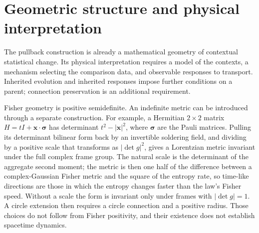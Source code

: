 \section{Geometric structure and physical interpretation}

The pullback construction is already a mathematical geometry of contextual statistical change. Its physical interpretation requires a model of the contexts, a mechanism selecting the comparison data, and observable responses to transport. Inherited evolution and inherited responses impose further conditions on a parent; connection preservation is an additional requirement.

Fisher geometry is positive semidefinite. An indefinite metric can be introduced through a separate construction. For example, a Hermitian $2\times2$ matrix $H=tI+\boldsymbol x\cdot\boldsymbol\sigma$ has determinant $t^2-|\boldsymbol x|^2$, where $\boldsymbol\sigma$ are the Pauli matrices. Pulling its determinant bilinear form back by an invertible soldering field, and dividing by a positive scale that transforms as $|\det g|^2$, gives a Lorentzian metric invariant under the full complex frame group. The natural scale is the determinant of the aggregate second moment; the metric is then one half of the difference between a complex-Gaussian Fisher metric and the square of the entropy rate, so time-like directions are those in which the entropy changes faster than the law's Fisher speed. Without a scale the form is invariant only under frames with $|\det g|=1$. A circle extension then requires a circle connection and a positive radius. Those choices do not follow from Fisher positivity, and their existence does not establish spacetime dynamics.
